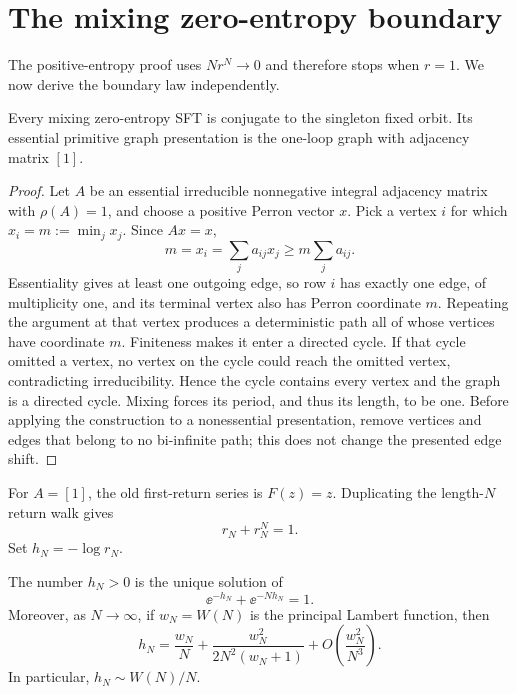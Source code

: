 \section{The mixing zero-entropy boundary}
\label{sec:zero}

The positive-entropy proof uses $Nr^N\to0$ and therefore stops when $r=1$.
We now derive the boundary law independently.

\begin{lemma}
\label{lem:zero-reduction}
Every mixing zero-entropy SFT is conjugate to the singleton fixed orbit.  Its
essential primitive graph presentation is the one-loop graph with adjacency
matrix $[1]$.
\end{lemma}

\begin{proof}
Let $A$ be an essential irreducible nonnegative integral adjacency matrix
with $\rho(A)=1$, and choose a positive Perron vector $x$.  Pick a vertex
$i$ for which $x_i=m:=\min_jx_j$.  Since $Ax=x$,
\[
 m=x_i=\sum_j a_{ij}x_j\ge m\sum_j a_{ij}.
\]
Essentiality gives at least one outgoing edge, so row $i$ has exactly one
edge, of multiplicity one, and its terminal vertex also has Perron coordinate
$m$.  Repeating the argument at that vertex produces a deterministic path
all of whose vertices have coordinate $m$.  Finiteness makes it enter a
directed cycle.  If that cycle omitted a vertex, no vertex on the cycle could
reach the omitted vertex, contradicting irreducibility.  Hence the cycle
contains every vertex and the graph is a directed cycle.  Mixing forces its
period, and thus its length, to be one.  Before applying the construction to
a nonessential presentation, remove vertices and edges that belong to no
bi-infinite path; this does not change the presented edge shift.
\end{proof}

For $A=[1]$, the old first-return series is $F(z)=z$.  Duplicating the
length-$N$ return walk gives
\[
 r_N+r_N^N=1.
\]
Set $h_N=-\log r_N$.

\begin{theorem}
\label{thm:zero}
The number $h_N>0$ is the unique solution of
\begin{equation}
 \ee^{-h_N}+\ee^{-Nh_N}=1.
 \label{eq:zero}
\end{equation}
Moreover, as $N\to\infty$, if $w_N=W(N)$ is the principal Lambert function,
then
\begin{equation}
 h_N=\frac{w_N}{N}
 +\frac{w_N^2}{2N^2(w_N+1)}
 +O\left(\frac{w_N^2}{N^3}\right).
 \label{eq:lambert}
\end{equation}
In particular, $h_N\sim W(N)/N$.
\end{theorem}

